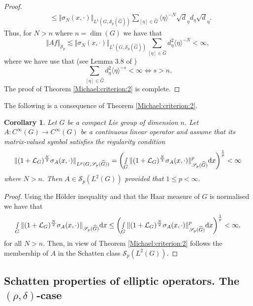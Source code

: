 \documentclass[12pt, reqno]{amsart}
\newtheorem{corollary}[theorem]{Corollary}
\theoremstyle{definition}
\theoremstyle{remark}
\numberwithin{equation}{section}
\begin{document}
\begin{proof}
\begin{align*}
   &\leq  \Vert {\sigma}_{N }(x,\cdot)\Vert_{L^1(G,\mathscr{S}_p(\widehat{G}))}  \sum_{[\eta]\in \widehat{G}}\langle \eta\rangle^{-N}\sqrt{d}_\eta d_\eta \sqrt{d}_\eta.
\end{align*} Thus, for $N>n$ where $n=\dim(G)$ we have that 
\begin{equation}
  \Vert Af \Vert_{\mathscr{S}_p} \lesssim    \Vert {\sigma}_{N }(x,\cdot)\Vert_{L^1(G,\mathscr{S}_p(\widehat{G}))} \sum_{[\eta]\in \widehat{G}}d_\eta^2\langle \eta\rangle^{-N}<\infty,
\end{equation} where we have use that (see Lemma 3.8 of \cite{DelRuzTrace11})
$$ \sum_{[\eta]\in \widehat{G}}d_\eta^2\langle \eta\rangle^{-s}<\infty \Longleftrightarrow s>n. $$
The proof of Theorem \ref{Michael:criterion:2} is complete.
\end{proof}
The following is a consequence of Theorem \ref{Michael:criterion:2}.
\begin{corollary}Let $G$ be a compact Lie group of dimension $n.$ Let $A:C^\infty(G)\rightarrow C^\infty(G) $ be a continuous linear operator and assume that its matrix-valued symbol satisfies the regularity condition
\begin{equation}
    \Vert (1+\mathcal{L}_G)^{\frac{N}{2}}\sigma_A(x,\cdot)\Vert_{L^p(G,\mathscr{S}_p(\widehat{G}))}=\left(\smallint\limits_G\Vert (1+\mathcal{L}_G)^{\frac{N}{2}}\sigma_A(x,\cdot)\Vert_{\mathscr{S}_p(\widehat{G})}^p\textnormal{d}x\right)^{\frac{1}{p}}<\infty
\end{equation}where $N>n.$ Then $A\in \mathscr{S}_{p}(L^2(G))$ provided that $1\leq p<\infty.$
\end{corollary}
\begin{proof}Using the H\"older inequality and that the Haar measure of $G$ is normalised we have that
\begin{align}
   \smallint\limits_G\Vert (1+\mathcal{L}_G)^{\frac{N}{2}}\sigma_A(x,\cdot)\Vert_{\mathscr{S}_p(\widehat{G})}\textnormal{d}x\leq \left( \smallint\limits_G\Vert (1+\mathcal{L}_G)^{\frac{N}{2}}\sigma_A(x,\cdot)\Vert_{\mathscr{S}_p(\widehat{G})}^p\textnormal{d}x  \right)^{\frac{1}{p}}<\infty,
\end{align}for all $N>n.$ Then, in view of Theorem \ref{Michael:criterion:2} follows the membership of $A$ in the Schatten class $\mathscr{S}_p(L^2(G)).$    
\end{proof}


\subsection{Schatten properties of elliptic operators. The $(\rho,\delta)$-case}\label{rhodeltasection}
\end{document}

